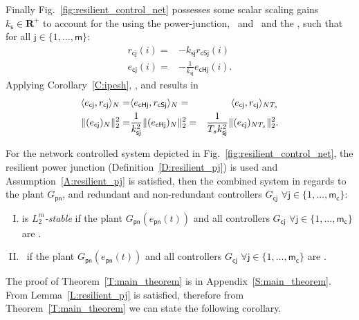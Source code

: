 Finally Fig.~\ref{fig:resilient_control_net} possesses some scalar scaling gains $k_{\mathsf{s}} \in \mathbf{R}^+$ to account for the using the power-junction, \PS\ and \PH\ and the \IPESH, such that for all $\mathsf{j} \in \{1,\dots,\mathsf{m}\}$:
\begin{align}
\label{E:ipes_ks}
r_{\mathsf{cj}}(i) =& -k_{\mathsf{sj}} r_{\mathsf{cSj}}(i)\\
\label{E:ipes_zoh_ks}
e_{\mathsf{cj}}(i) =& -\frac{1}{k_{\mathsf{sj}}} e_{\mathsf{cHj}}(i).
\end{align}
Applying Corollary~\ref{C:ipesh}, , and
 results in 
\begin{align}
\label{E:ipesh_con_ip}
\langle e_{\mathsf{cj}},r_{\mathsf{cj}} \rangle_N =&
\langle e_{\mathsf{cHj}},r_{\mathsf{cSj}} \rangle_N =& \langle e_{\mathsf{cj}},r_{\mathsf{cj}} \rangle_{NT_s}\\
\label{E:ipesh_con_e2}
\|(e_{\mathsf{cj}})_{N}\|_{2}^2=&
\frac{1}{k_{\mathsf{sj}}^2}\|(e_{\mathsf{cHj}})_{N}\|_{2}^2 =& \frac{1}{T_s k_{\mathsf{sj}}^2}\|(e_{\mathsf{cj}})_{NT_s}\|_{2}^2.
\end{align}
\begin{theorem}
\label{T:main_theorem}
For the network controlled system depicted in
Fig.~\ref{fig:resilient_control_net}, the resilient power junction
(Definition~\ref{D:resilient_pj}) is used and
Assumption~\ref{A:resilient_pj} is satisfied, then the combined system
in regards to the plant $G_{\mathsf{pn}}$, and redundant and
non-redundant controllers $G_{\mathsf{cj}}$ $\forall \mathsf{j} \in 
\{1,\dots,\mathsf{m_c}\}$:
\begin{enumerate}[I.]
\item is {\it $L^m_2$-stable} if the plant
  $G_{\mathsf{pn}}(e_{\mathsf{pn}}(t))$ and all controllers
  $G_{\mathsf{cj}}$  $\forall \mathsf{j} \in \{1,\dots,\mathsf{m_c}\}$
  are \sop.
\item \passive\ if the plant $G_{\mathsf{pn}}(e_{\mathsf{pn}}(t))$ and
  all controllers $G_{\mathsf{cj}}$ $\forall \mathsf{j} \in
  \{1,\dots,\mathsf{m_c}\}$ are \passive.
\end{enumerate}
\end{theorem}
The proof of Theorem~\ref{T:main_theorem} is in Appendix~\ref{S:main_theorem}.
From Lemma~\ref{L:resilient_pj}  is 
satisfied, therefore from Theorem~\ref{T:main_theorem} we can state the
following corollary.
